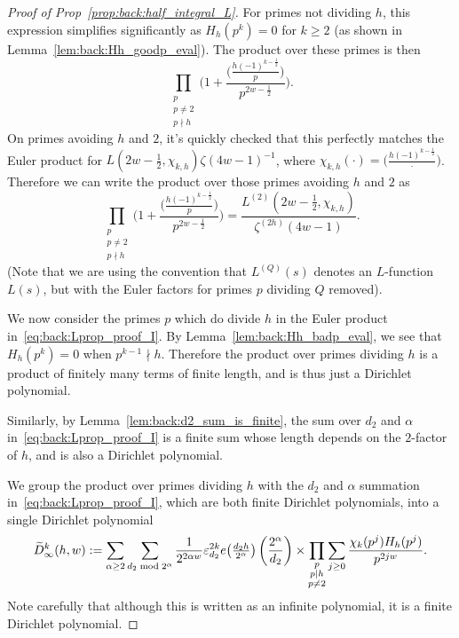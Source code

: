 \begin{proof}[Proof of Prop~\ref{prop:back:half_integral_L}]
  For primes not dividing $h$, this expression simplifies significantly as $H_h(p^k) = 0$
  for $k \geq 2$ (as shown in Lemma~\ref{lem:back:Hh_goodp_eval}).
  The product over these primes is then
  \begin{equation}
    \prod_{\substack{p \\ p \neq 2 \\ p \nmid h}} \Big( 1 + \frac{\big(\frac{h (-1)^{k -
    \frac{1}{2}}}{p}\big)} {p^{2w - \frac{1}{2}}} \Big).
  \end{equation}
  On primes avoiding $h$ and $2$, it's quickly checked that this perfectly matches the
  Euler product for $L(2w-\frac{1}{2}, \chi_{k,h}) \zeta(4w-1)^{-1}$, where
  $\chi_{k,h}(\cdot) = \big( \frac{h (-1)^{k - \frac{1}{2}}}{\cdot} \big)$.
  Therefore we can write the product over those primes avoiding $h$ and $2$ as
  \begin{equation}
    \prod_{\substack{p \\ p \neq 2 \\ p \nmid h}} \Big( 1 + \frac{\big(\frac{h (-1)^{k -
    \frac{1}{2}}}{p}\big)} {p^{2w - \frac{1}{2}}} \Big)
    =
    \frac{L^{(2)} (2w - \frac{1}{2}, \chi_{k,h})}{\zeta^{(2h)}(4w-1)}.
  \end{equation}
  (Note that we are using the convention that $L^{(Q)}(s)$ denotes an $L$-function $L(s)$,
  but with the Euler factors for primes $p$ dividing $Q$ removed).


  We now consider the primes $p$ which do divide $h$ in the Euler product
  in~\eqref{eq:back:Lprop_proof_I}.
  By Lemma~\ref{lem:back:Hh_badp_eval}, we see that $H_h(p^k) = 0$ when $p^{k-1} \nmid h$.
  Therefore the product over primes dividing $h$ is a product of finitely many terms of
  finite length, and is thus just a Dirichlet polynomial.


  Similarly, by Lemma~\ref{lem:back:d2_sum_is_finite}, the sum over $d_2$ and $\alpha$
  in~\eqref{eq:back:Lprop_proof_I} is a finite sum whose length depends on the $2$-factor
  of $h$, and is also a Dirichlet polynomial.


  We group the product over primes dividing $h$ with the $d_2$ and $\alpha$ summation
  in~\eqref{eq:back:Lprop_proof_I}, which are both finite Dirichlet polynomials, into a
  single Dirichlet polynomial
  \begin{equation}
    \begin{split}
      \widetilde{D}_\infty^k (h,w) :=
      \sum_{\alpha \geq 2} \sum_{d_2 \bmod 2^\alpha}
        \frac{1}{2^{2\alpha w}} \varepsilon_{d_2}^{2k} e \big( \tfrac{d_2 h}{2^\alpha} \big)
        \left(\frac{2^\alpha}{d_2}\right)
      \times
      \prod_{\substack{p \\ p \mid h \\ p \neq 2}}
        \sum_{j \geq 0} \frac{\chi_k(p^j) H_h(p^j)}{p^{2jw}}.
    \end{split}
  \end{equation}
  Note carefully that although this is written as an infinite polynomial, it is a finite
  Dirichlet polynomial.



\end{proof}
